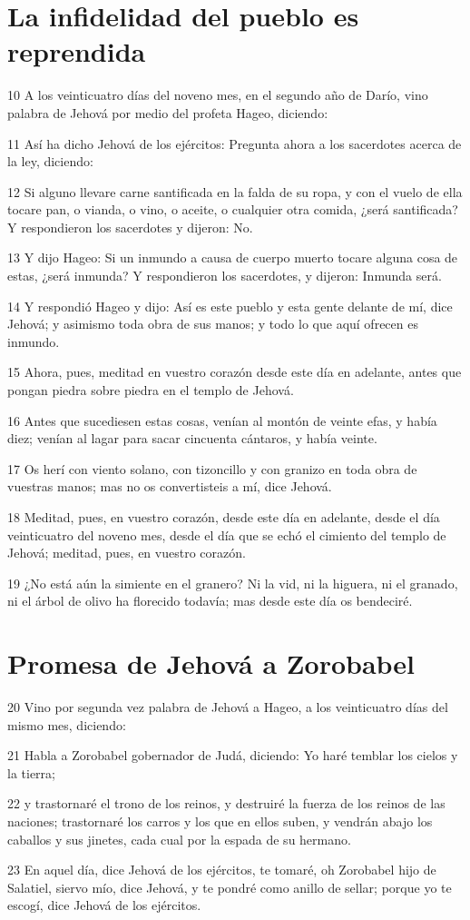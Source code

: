 \section*{La infidelidad del pueblo es reprendida}

\par 10 A los veinticuatro días del noveno mes, en el segundo año de Darío, vino palabra de Jehová por medio del profeta Hageo, diciendo:
\par 11 Así ha dicho Jehová de los ejércitos: Pregunta ahora a los sacerdotes acerca de la ley, diciendo:
\par 12 Si alguno llevare carne santificada en la falda de su ropa, y con el vuelo de ella tocare pan, o vianda, o vino, o aceite, o cualquier otra comida, ¿será santificada? Y respondieron los sacerdotes y dijeron: No.
\par 13 Y dijo Hageo: Si un inmundo a causa de cuerpo muerto tocare alguna cosa de estas, ¿será inmunda? Y respondieron los sacerdotes, y dijeron: Inmunda será.
\par 14 Y respondió Hageo y dijo: Así es este pueblo y esta gente delante de mí, dice Jehová; y asimismo toda obra de sus manos; y todo lo que aquí ofrecen es inmundo.
\par 15 Ahora, pues, meditad en vuestro corazón desde este día en adelante, antes que pongan piedra sobre piedra en el templo de Jehová. 
\par 16 Antes que sucediesen estas cosas, venían al montón de veinte efas,  y había diez; venían al lagar para sacar cincuenta cántaros, y había veinte.
\par 17 Os herí con viento solano, con tizoncillo y con granizo en toda obra de vuestras manos; mas no os convertisteis a mí, dice Jehová.
\par 18 Meditad, pues, en vuestro corazón, desde este día en adelante, desde el día veinticuatro del noveno mes, desde el día que se echó el cimiento del templo de Jehová; meditad, pues, en vuestro corazón.
\par 19 ¿No está aún la simiente en el granero? Ni la vid, ni la higuera, ni el granado, ni el árbol de olivo ha florecido todavía; mas desde este día os bendeciré.

\section*{Promesa de Jehová a Zorobabel}

\par 20 Vino por segunda vez palabra de Jehová a Hageo, a los veinticuatro días del mismo mes, diciendo:
\par 21 Habla a Zorobabel gobernador de Judá, diciendo: Yo haré temblar los cielos y la tierra;
\par 22 y trastornaré el trono de los reinos, y destruiré la fuerza de los reinos de las naciones; trastornaré los carros y los que en ellos suben, y vendrán abajo los caballos y sus jinetes, cada cual por la espada de su hermano.
\par 23 En aquel día, dice Jehová de los ejércitos, te tomaré, oh Zorobabel hijo de Salatiel, siervo mío, dice Jehová, y te pondré como anillo de sellar; porque yo te escogí, dice Jehová de los ejércitos.

